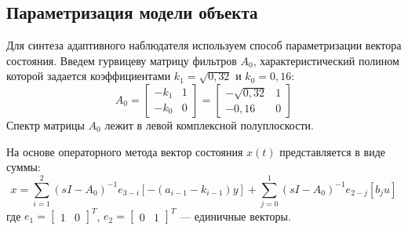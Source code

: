 \documentclass[a4paper,12pt]{article}
\begin{document}
\subsection{Параметризация модели объекта}
Для синтеза адаптивного наблюдателя используем способ параметризации вектора состояния. Введем гурвицеву матрицу фильтров $A_0$, характеристический полином которой задается коэффициентами $k_1 = \sqrt{0{,}32}$ и $k_0 = 0{,}16$:
\begin{equation}
	A_0 = \begin{bmatrix} -k_1 & 1 \\ -k_0 & 0 \end{bmatrix} = \begin{bmatrix} -\sqrt{0{,}32} & 1 \\ -0{,}16 & 0 \end{bmatrix}
\end{equation}
Спектр матрицы $A_0$ лежит в левой комплексной полуплоскости.

На основе операторного метода вектор состояния $x(t)$ представляется в виде суммы:
\begin{equation}
	x = \sum_{i=1}^{2} (sI - A_0)^{-1} e_{3-i} [-(a_{i-1} - k_{i-1}) y] + \sum_{j=0}^{1} (sI - A_0)^{-1} e_{2-j} [b_j u]
	\label{eq:param_x}
\end{equation}
где $e_1 = \begin{bmatrix} 1 & 0 \end{bmatrix}^T$, $e_2 = \begin{bmatrix} 0 & 1 \end{bmatrix}^T$ --- единичные векторы. 
\end{document}
